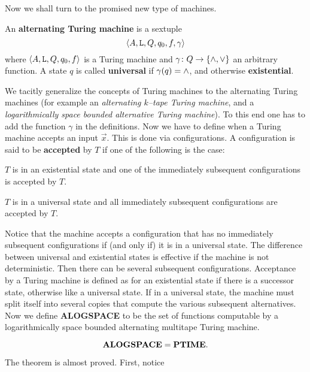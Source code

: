 Now we shall turn to the promised new type of machines.
\begin{defn}
An \textbf{alternating Turing machine}
is a sextuple
\begin{equation}
\langle A, \mbox{\tt L}, Q, q_0, f, \gamma\rangle
\end{equation}
where $\langle A, \mbox{\tt L}, Q, q_0, f\rangle$ is a Turing machine
and $\gamma \colon Q \rightarrow \{\wedge, \vee\}$ an arbitrary function.
A state $q$ is called \textbf{universal} if $\gamma(q) = \wedge$, and
otherwise \textbf{existential}.
\end{defn}
We tacitly generalize the concepts of Turing machines to the
alternating Turing machines (for example an {\it alternating
$k$--tape Turing machine}, and a {\it logarithmically space bounded
alternative Turing machine\/}). To this end one has to add the
function $\gamma$ in the definitions. Now we have to define
when a Turing machine accepts an input $\vec{x}$. This is done
via configurations. A configuration is said to be
\textbf{accepted} by $T$  if one of the following is the case:
\begin{dinglist}{43}
\item
$T$ is in an existential state and one of the
immediately subsequent configurations is accepted by $T$.
\item
$T$ is in a universal state and all immediately subsequent
configurations are accepted by $T$.
\end{dinglist}
Notice that the machine accepts a configuration that has no
immediately subsequent configurations if (and only if) it is 
in a universal state. The difference between universal and 
existential states is effective if the machine is not deterministic. 
Then there can be several subsequent configurations. Acceptance
by a Turing machine is defined as for an existential state if 
there is a successor state, otherwise like a universal state. 
If in a universal state, the machine must split itself into 
several copies that compute the various subsequent alternatives. 
Now we define \textbf{ALOGSPACE} 
to be the set of functions 
computable by a logarithmically space bounded alternating 
multitape Turing machine.
\begin{thm}
$$\mbox{\textbf{ALOGSPACE}} = \mbox{\textbf{PTIME}}.$$
\end{thm}
The theorem is almost proved. First, notice 
